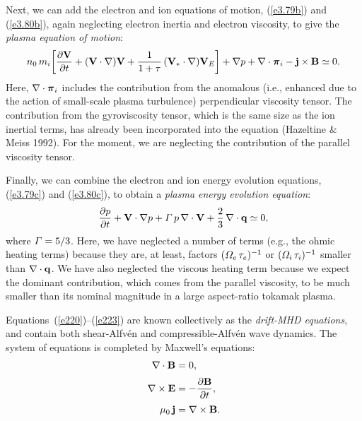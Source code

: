 \documentclass[notitlepage,12pt]{article}
\newcommand{\bpi}{\mbox{\boldmath$\pi$}}
\begin{document}
Next, we can add the electron and ion equations of motion, (\ref{e3.79b}) and (\ref{e3.80b}), again neglecting electron inertia and electron viscosity, 
to give the {\em plasma equation of motion}: 
\begin{equation}
n_0\,m_i\!\left[\frac{\partial {\bf V}}{\partial t} + ({\bf V}\cdot\nabla ){\bf V} + \frac{1}{1+\tau}\,({\bf V}_\ast\cdot\nabla){\bf V}_E\right]
+ \nabla p + \nabla\cdot\bpi_i - {\bf j}\times {\bf B}\simeq 0.
\end{equation}
Here, $\nabla\cdot\bpi_i$ includes the contribution from the anomalous (i.e., enhanced due to the action of small-scale plasma turbulence) perpendicular viscosity tensor. The contribution from the gyroviscosity tensor,
which is the same size as the ion inertial terms, has already been incorporated into the equation (Hazeltine \& Meiss 1992). For the moment, we are neglecting the contribution of the parallel viscosity tensor. 

Finally, we can combine the electron and ion energy evolution equations, (\ref{e3.79c}) and (\ref{e3.80c}), to obtain
a {\em plasma energy evolution equation}:
\begin{equation}
\frac{\partial p}{\partial t} + {\bf V}\cdot\nabla p + {\mit\Gamma}\,p\,\nabla\cdot{\bf V} + \frac{2}{3}\,\nabla\cdot {\bf q}\simeq 0, 
\label{e223}
\end{equation}
where ${\mit\Gamma}=5/3$. Here, we have neglected a number of  terms (e.g., the ohmic heating terms) because they
are, at least, factors $({\mit\Omega}_e\,\tau_e)^{-1}$ or  $({\mit\Omega}_i\,\tau_i)^{-1}$ smaller than $\nabla\cdot{\bf q}$. We have also neglected the viscous heating term because we
expect the dominant contribution, which comes from the parallel viscosity, to be much smaller than its nominal magnitude in a large aspect-ratio tokamak
plasma. 

Equations~(\ref{e220})--(\ref{e223}) are known collectively as the {\em drift-MHD equations}, and contain both shear-Alfv\'{e}n
and compressible-Alfv\'{e}n wave dynamics. The system of equations is completed by Maxwell's equations:
\begin{align}
\nabla\cdot{\bf B} &= 0,\\[0.5ex]
\nabla\times {\bf E} &= - \frac{\partial {\bf B}}{\partial t},\\[0.5ex]
\mu_0\,{\bf j} &= \nabla \times {\bf B}.\label{e226}
\end{align}
\end{document}
